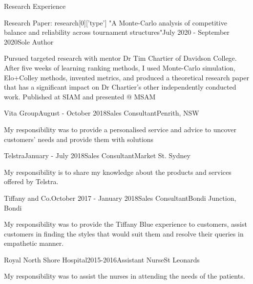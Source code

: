 \documentclass{resume} %
\begin{document}
\begin{rSection}{Research Experience}

\begin{rSubsection}{Research Paper: {{research[0]['type']}} "A Monte-Carlo analysis of competitive balance and reliability across tournament structures"}{July 2020 - September 2020}{Sole Author}
\item Pursued targeted research with  mentor Dr Tim Chartier of Davidson College. After five weeks of learning ranking methods, I used Monte-Carlo simulation, Elo+Colley methods, invented metrics, and produced a theoretical research paper that has a significant impact on Dr Chartier's other independently conducted work. Published at SIAM and presented @ MSAM

\end{rSubsection}


\begin{rSubsection}{Vita Group}{August - October 2018}{Sales Consultant}{Penrith, NSW}
\item My responsibility was to provide a personalised service and advice to uncover customers' needs and provide them with solutions
\end{rSubsection}


\begin{rSubsection}{Telstra}{January - July 2018}{Sales Consultant}{Market St. Sydney}
\item My responsibility is to share my knowledge about the products and services  offered by Telstra. 
\end{rSubsection}

\begin{rSubsection}{Tiffany and Co.}{October 2017 - January 2018}{Sales Consultant}{Bondi Junction, Bondi}
\item My responsibility was to provide the Tiffany Blue experience to customers, assist customers in finding the styles that would suit them and resolve their queries in empathetic manner.

\end{rSubsection}

\begin{rSubsection}{Royal North Shore Hospital}{2015-2016}{Assistant Nurse}{St Leonards}
\item My responsibility was to assist the nurses in attending the needs of the patients. 

\end{rSubsection}
\end{rSection}
\end{document}

